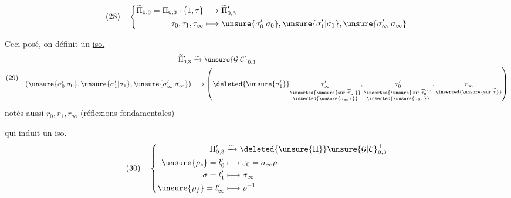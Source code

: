 
\[
(28)\quad
\left\{\begin{aligned}
\widetilde{\Pi}_{0,3}=\Pi_{0,3}\cdot\{1,\tau\}&\longrightarrow\widetilde{\Pi}'_{0,3}\\
\tau_0,\tau_1,\tau_\infty&\longmapsto
\unsure{\sigma'_0|\sigma_0},\unsure{\sigma'_1|\sigma_1},\unsure{\sigma'_\infty|\sigma_\infty}
\end{aligned}\right.
\]

Ceci posé, on définit un \uline{iso.} 
\[
(29)\quad
\begin{aligned}
\widetilde{\Pi}'_{0,3}&\xrightarrow{\sim}\unsure{\mathcal{G}|\mathcal{C}}_{0,3}\\
(\unsure{\sigma'_0|\sigma_0},\unsure{\sigma'_1|\sigma_1},\unsure{\sigma'_\infty|\sigma_\infty})
&\longrightarrow
\left(\deleted{\unsure{\sigma^{\prime}_1}}
\underset{\substack{\inserted{\unsure{\text{sur }\widetilde{\tau}'_\infty}}\\\inserted{\unsure{\dot{\sigma}_\infty\tau}}}}{\tau'_\infty},
\underset{\substack{\inserted{\unsure{\text{sur }\widetilde{\tau}'_0}}\\\inserted{\unsure{\dot{\sigma}_0\tau}}}}{\tau'_0},
\underset{\inserted{\unsure{\text{sur }\widetilde{\tau}}}}{\tau_\infty}\right)
\end{aligned}
\]
notés aussi $r_0,r_1,r_\infty$ (\uline{réflexions} fondamentales)


qui induit un iso.
\[
(30)\quad
\left\{\begin{aligned}
\Pi'_{0,3}&\xrightarrow{\sim}\deleted{\unsure{\Pi}}\unsure{\mathcal{G}|\mathcal{C}}_{0,3}^{+}\\
\unsure{\rho_s}=l'_0&\longmapsto\varepsilon_0=\sigma_\infty\rho\\
\sigma=l'_1&\longmapsto\sigma_\infty\\
\unsure{\rho_f}=l'_\infty&\longmapsto\rho^{-1}
\end{aligned}\right.
\]

